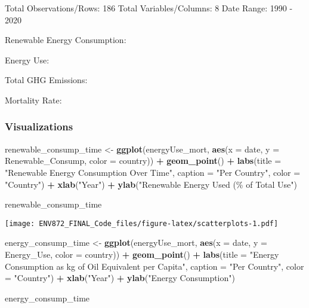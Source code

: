 \documentclass[
]{article}
\newenvironment{Shaded}{\begin{snugshade}}{\end{snugshade}}
\newcommand{\AttributeTok}[1]{\textcolor[rgb]{0.13,0.29,0.53}{#1}}
\newcommand{\FunctionTok}[1]{\textcolor[rgb]{0.13,0.29,0.53}{\textbf{#1}}}
\newcommand{\NormalTok}[1]{#1}
\newcommand{\OtherTok}[1]{\textcolor[rgb]{0.56,0.35,0.01}{#1}}
\newcommand{\SpecialCharTok}[1]{\textcolor[rgb]{0.81,0.36,0.00}{\textbf{#1}}}
\newcommand{\StringTok}[1]{\textcolor[rgb]{0.31,0.60,0.02}{#1}}
\begin{document}
Total Observations/Rows: 186 Total Variables/Columns: 8 Date Range: 1990
- 2020

Renewable Energy Consumption:

Energy Use:

Total GHG Emissions:

Mortality Rate:

\hypertarget{visualizations}{%
\subsubsection{Visualizations}\label{visualizations}}

\begin{Shaded}
\begin{Highlighting}[]
\NormalTok{renewable\_consump\_time }\OtherTok{\textless{}{-}} \FunctionTok{ggplot}\NormalTok{(energyUse\_mort,}
    \FunctionTok{aes}\NormalTok{(}\AttributeTok{x =}\NormalTok{ date, }\AttributeTok{y =}\NormalTok{ Renewable\_Consump, }\AttributeTok{color =}\NormalTok{ country)) }\SpecialCharTok{+}
    \FunctionTok{geom\_point}\NormalTok{() }\SpecialCharTok{+} \FunctionTok{labs}\NormalTok{(}\AttributeTok{title =} \StringTok{"Renewable Energy Consumption Over Time"}\NormalTok{,}
    \AttributeTok{caption =} \StringTok{"Per Country"}\NormalTok{, }\AttributeTok{color =} \StringTok{"Country"}\NormalTok{) }\SpecialCharTok{+}
    \FunctionTok{xlab}\NormalTok{(}\StringTok{"Year"}\NormalTok{) }\SpecialCharTok{+} \FunctionTok{ylab}\NormalTok{(}\StringTok{"Renewable Energy Used (\% of Total Use"}\NormalTok{)}

\NormalTok{renewable\_consump\_time}
\end{Highlighting}
\end{Shaded}

\texttt{[image: ENV872\_FINAL\_Code\_files/figure-latex/scatterplots-1.pdf]}

\begin{Shaded}
\begin{Highlighting}[]
\NormalTok{energy\_consump\_time }\OtherTok{\textless{}{-}} \FunctionTok{ggplot}\NormalTok{(energyUse\_mort,}
    \FunctionTok{aes}\NormalTok{(}\AttributeTok{x =}\NormalTok{ date, }\AttributeTok{y =}\NormalTok{ Energy\_Use, }\AttributeTok{color =}\NormalTok{ country)) }\SpecialCharTok{+}
    \FunctionTok{geom\_point}\NormalTok{() }\SpecialCharTok{+} \FunctionTok{labs}\NormalTok{(}\AttributeTok{title =} \StringTok{"Energy Consumption as kg of Oil Equivalent per Capita"}\NormalTok{,}
    \AttributeTok{caption =} \StringTok{"Per Country"}\NormalTok{, }\AttributeTok{color =} \StringTok{"Country"}\NormalTok{) }\SpecialCharTok{+}
    \FunctionTok{xlab}\NormalTok{(}\StringTok{"Year"}\NormalTok{) }\SpecialCharTok{+} \FunctionTok{ylab}\NormalTok{(}\StringTok{"Energy Consumption"}\NormalTok{)}

\NormalTok{energy\_consump\_time}
\end{Highlighting}
\end{Shaded}
\end{document}
